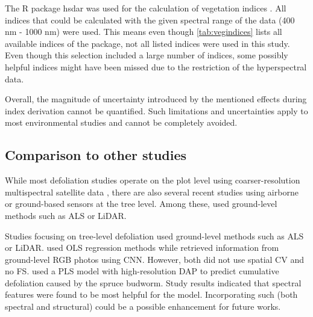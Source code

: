 \documentclass[letterpaper, peerreview, draftcls]{IEEEtran}
\begin{document}
The R package hsdar was used for the calculation of vegetation indices \cite{lehnert2016}.
All indices that could be calculated with the given spectral range of the data (400 nm - 1000 nm) were used.
This means even though \autoref{tab:vegindices} lists all available indices of the package, not all listed indices were used in this study.
Even though this selection included a large number of indices, some possibly helpful indices might have been missed due to the restriction of the hyperspectral data.



Overall, the magnitude of uncertainty introduced by the mentioned effects during index derivation cannot be quantified.
Such limitations and uncertainties apply to most environmental studies and cannot be completely avoided.

\subsection{Comparison to other studies}

While most defoliation studies operate on the plot level using coarser-resolution multispectral satellite data \cite{townsend2012, debeurs2008, rengarajan2016}, there are also several recent studies using airborne or ground-based sensors at the tree level.
Among these, \cite{meng2018, kalin2019} used ground-level methods such as \ac{ALS} or \ac{LiDAR}.

Studies focusing on tree-level defoliation used ground-level methods such as \ac{ALS} or \ac{LiDAR}\cite{meng2018, kalin2019}.
\cite{meng2018} used \ac{OLS} regression methods while \cite{kalin2019} retrieved information from ground-level RGB photos using \ac{CNN}.
However, both did not use spatial \ac{CV} and \cite{kalin2019} no \ac{FS}.
\cite{goodbody2018} used a \ac{PLS} model with high-resolution \ac{DAP} to predict cumulative defoliation caused by the spruce budworm.
Study results indicated that spectral features were found to be most helpful for the model.
Incorporating such (both spectral and structural) could be a possible enhancement for future works.
\end{document}
